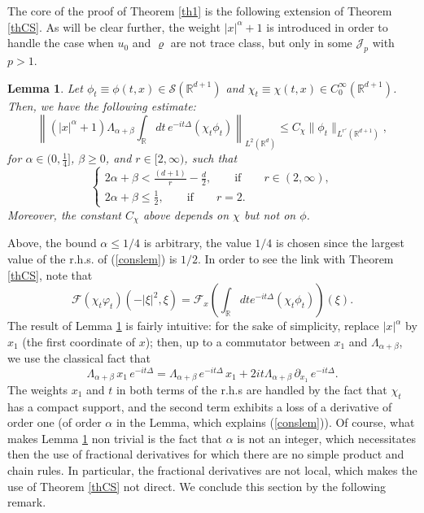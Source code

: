 \documentclass[12pt]{article}
\newtheorem{lemma}[theorem]{Lemma}
\def \Rm {\mathbb R}
\newcommand{\ds}{\displaystyle}
\newcommand{\calF}{\mathcal F}
\newcommand{\calS}{\mathcal S}
\newcommand{\calJ}{\mathcal J}
\def\fref#1{{\rm (\ref{#1})}}
\newcommand{\be}{\begin{equation}}
\newcommand{\ee}{\end{equation}}
\begin{document}
The core of the proof of Theorem \ref{th1} is the following extension of Theorem \ref{thCS}. As will be clear further, the weight $|x|^\alpha+1$ is introduced in order to handle the case when $u_0$ and $\varrho$ are not trace class, but only in some $\calJ_p$ with $p>1$.
\begin{lemma} \label{pr1} Let $\phi_t \equiv \phi(t,x) \in \calS(\Rm^{d+1})$ and $\chi_t \equiv \chi(t,x) \in C_0^\infty(\Rm^{d+1})$. Then,  we have the following estimate:
$$
\left\| (|x|^\alpha+1) \Lambda_{\alpha+\beta} \int_{\Rm } dt \, e^{-i t \Delta} \left(\chi_t \phi_t\right) \right\|_{L^2(\Rm^d)} \leq C_\chi \| \phi_t \|_{L^{r'}(\Rm^{d+1})},
$$
for $\alpha \in (0,\frac{1}{4}]$, $\beta \geq 0$, and $ r \in [2,\infty)$, such that 
\be \label{conslem}
\left\{\begin{array}{l}
\ds 2\alpha+\beta < \frac{(d+1)}{r}-\frac{d}{2}, \qquad \textrm{if} \qquad r\in (2,\infty),\\
\ds 2\alpha+\beta \leq \frac{1}{2}, \qquad \textrm{if} \qquad r =2.
\end{array}
\right.
\ee
Moreover, the constant $C_\chi$ above depends on $\chi$ but not on $\phi$.
\end{lemma}
Above, the bound $\alpha \leq 1/4$ is arbitrary, the value $1/4$ is chosen since the largest value of the r.h.s. of \fref{conslem} is $1/2$. In order to see the link with Theorem \ref{thCS}, note that
$$
\calF(\chi_t \varphi_t)(-|\xi|^2,\xi) = \calF_x \left(\int_{\Rm } dt e^{-i t \Delta} \left(\chi_t \phi_t\right) \right)(\xi).
$$
The result of Lemma \ref{pr1} is fairly intuitive: for the sake of simplicity, replace $|x|^\alpha$ by $x_1$ (the first coordinate of $x$); then, up to a commutator between $x_1$ and $\Lambda_{\alpha+\beta}$, we use the classical fact that
$$
\Lambda_{\alpha+\beta} \, x_1\, e^{-it\Delta} = \Lambda_{\alpha+\beta}\, e^{-it\Delta} \, x_1+ 2 i t\Lambda_{\alpha+\beta}\, \partial_{x_1} \, e^{-it\Delta}.
$$
The weights $x_1$ and $t $ in both terms of the r.h.s are handled by the fact that $\chi_t$ has a compact support, and the second term exhibits a loss of a derivative of order one (of order $\alpha$ in the Lemma, which explains \fref{conslem}). Of course, what makes Lemma \ref{pr1} non trivial is the fact that $\alpha$ is not an integer, which necessitates then the use of fractional derivatives for which there are no simple product and chain rules. In particular, the fractional derivatives are not local, which makes the use of Theorem \ref{thCS} not direct. We conclude this section by the following remark. 
\end{document}
